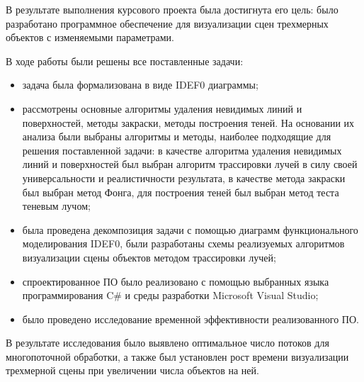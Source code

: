 
В результате выполнения курсового проекта была достигнута его цель: было разработано программное обеспечение для визуализации сцен трехмерных объектов с изменяемыми параметрами. 

В ходе работы были решены все поставленные задачи:
\begin{itemize}
	\item задача была формализована в виде IDEF0 диаграммы;
	\item рассмотрены основные алгоритмы удаления невидимых линий и поверхностей, методы закраски, методы построения теней. На основании их анализа были выбраны алгоритмы и методы, наиболее подходящие для решения поставленной задачи: в качестве алгоритма удаления невидимых линий и поверхностей был выбран алгоритм трассировки лучей в силу своей универсальности и реалистичности результата, в качестве метода закраски был выбран метод Фонга, для построения теней был выбран метод теста теневым лучом;
	\item была проведена декомпозиция задачи с помощью диаграмм функционального моделирования IDEF0, были разработаны схемы реализуемых алгоритмов визуализации сцены объектов методом трассировки лучей;
	\item спроектированное ПО было реализовано с помощью выбранных языка программирования C\# и среды разработки Microsoft Visual Studio;
	\item было проведено исследование временной эффективности реализованного ПО.
\end{itemize}

В результате исследования было выявлено оптимальное число потоков для многопоточной обработки, а также был установлен рост времени визуализации трехмерной сцены при увеличении числа объектов на ней.